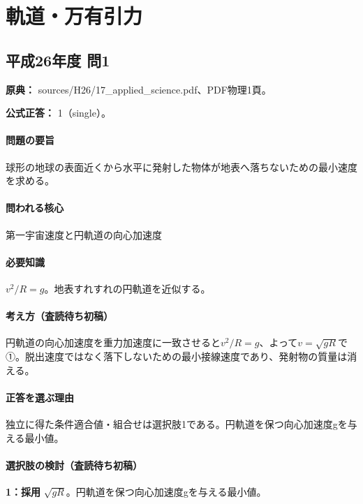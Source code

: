 \section{軌道・万有引力}

\subsection{平成26年度 問1}
\label{q:h26-reg-applied-01}

\noindent\textbf{原典：} sources/H26/17\_applied\_science.pdf、PDF物理1頁。

\textbf{公式正答：} 1（single）。

\paragraph{問題の要旨} 球形の地球の表面近くから水平に発射した物体が地表へ落ちないための最小速度を求める。

\paragraph{問われる核心} 第一宇宙速度と円軌道の向心加速度

\paragraph{必要知識} \(v^2/R=g\)。地表すれすれの円軌道を近似する。

\paragraph{考え方（査読待ち初稿）} 円軌道の向心加速度を重力加速度に一致させると\(v^2/R=g\)、よって\(v=\sqrt{gR}\)で①。脱出速度ではなく落下しないための最小接線速度であり、発射物の質量は消える。

\paragraph{正答を選ぶ理由} 独立に得た条件適合値・組合せは選択肢1である。円軌道を保つ向心加速度gを与える最小値。

\paragraph{選択肢の検討（査読待ち初稿）}

\noindent\textbf{1：採用} \(\sqrt{gR}\)。円軌道を保つ向心加速度gを与える最小値。\par

